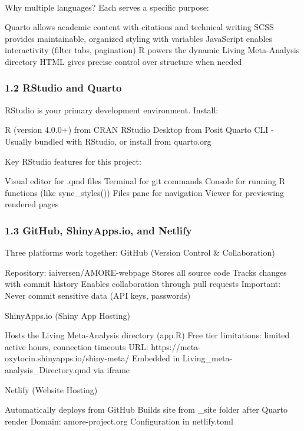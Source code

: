 \documentclass[
  letterpaper,
  DIV=11,
  numbers=noendperiod]{scrartcl}
\makeatletter
\let\oldparagraph\paragraph
\renewcommand{\paragraph}{
    \@ifstar
      \xxxParagraphStar
      \xxxParagraphNoStar
  }
\newcommand{\xxxParagraphStar}[1]{\oldparagraph*{#1}\mbox{}}
\newcommand{\xxxParagraphNoStar}[1]{\oldparagraph{#1}\mbox{}}
\makeatother
\begin{document}
\paragraph{Why multiple languages? Each serves a specific
purpose:}\label{why-multiple-languages-each-serves-a-specific-purpose}

Quarto allows academic content with citations and technical writing SCSS
provides maintainable, organized styling with variables JavaScript
enables interactivity (filter tabs, pagination) R powers the dynamic
Living Meta-Analysis directory HTML gives precise control over structure
when needed

\subsubsection{1.2 RStudio and Quarto}\label{rstudio-and-quarto}

RStudio is your primary development environment. Install:

R (version 4.0.0+) from CRAN RStudio Desktop from Posit Quarto CLI -
Usually bundled with RStudio, or install from quarto.org

Key RStudio features for this project:

Visual editor for .qmd files Terminal for git commands Console for
running R functions (like sync\_styles()) Files pane for navigation
Viewer for previewing rendered pages

\subsubsection{1.3 GitHub, ShinyApps.io, and
Netlify}\label{github-shinyapps.io-and-netlify}

Three platforms work together: GitHub (Version Control \& Collaboration)

Repository: iaiversen/AMORE-webpage Stores all source code Tracks
changes with commit history Enables collaboration through pull requests
Important: Never commit sensitive data (API keys, passwords)

ShinyApps.io (Shiny App Hosting)

Hosts the Living Meta-Analysis directory (app.R) Free tier limitations:
limited active hours, connection timeouts URL:
https://meta-oxytocin.shinyapps.io/shiny-meta/ Embedded in
Living\_meta-analysis\_Directory.qmd via iframe

Netlify (Website Hosting)

Automatically deploys from GitHub Builds site from \_site folder after
Quarto render Domain: amore-project.org Configuration in netlify.toml
\end{document}
